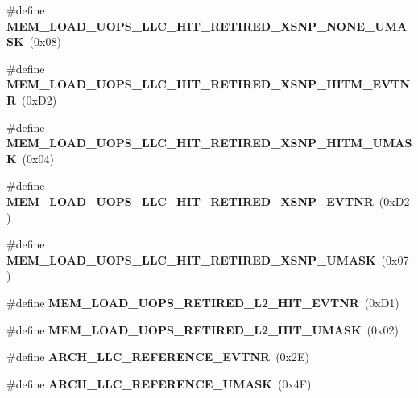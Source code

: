 \begin{DoxyCompactItemize}
\item 
\#define {\bfseries M\+E\+M\+\_\+\+L\+O\+A\+D\+\_\+\+U\+O\+P\+S\+\_\+\+L\+L\+C\+\_\+\+H\+I\+T\+\_\+\+R\+E\+T\+I\+R\+E\+D\+\_\+\+X\+S\+N\+P\+\_\+\+N\+O\+N\+E\+\_\+\+U\+M\+A\+S\+K}~(0x08)\label{types_8h_a88b8dc5c922214445a1261b75fdadece}

\item 
\#define {\bfseries M\+E\+M\+\_\+\+L\+O\+A\+D\+\_\+\+U\+O\+P\+S\+\_\+\+L\+L\+C\+\_\+\+H\+I\+T\+\_\+\+R\+E\+T\+I\+R\+E\+D\+\_\+\+X\+S\+N\+P\+\_\+\+H\+I\+T\+M\+\_\+\+E\+V\+T\+N\+R}~(0x\+D2)\label{types_8h_ae9f23b3173042a0c8efad2e54a38604e}

\item 
\#define {\bfseries M\+E\+M\+\_\+\+L\+O\+A\+D\+\_\+\+U\+O\+P\+S\+\_\+\+L\+L\+C\+\_\+\+H\+I\+T\+\_\+\+R\+E\+T\+I\+R\+E\+D\+\_\+\+X\+S\+N\+P\+\_\+\+H\+I\+T\+M\+\_\+\+U\+M\+A\+S\+K}~(0x04)\label{types_8h_aa57e7eeacd4455a45e3f3855d7dda1b7}

\item 
\#define {\bfseries M\+E\+M\+\_\+\+L\+O\+A\+D\+\_\+\+U\+O\+P\+S\+\_\+\+L\+L\+C\+\_\+\+H\+I\+T\+\_\+\+R\+E\+T\+I\+R\+E\+D\+\_\+\+X\+S\+N\+P\+\_\+\+E\+V\+T\+N\+R}~(0x\+D2)\label{types_8h_a9ab609523dfe9b17befadca150ac310f}

\item 
\#define {\bfseries M\+E\+M\+\_\+\+L\+O\+A\+D\+\_\+\+U\+O\+P\+S\+\_\+\+L\+L\+C\+\_\+\+H\+I\+T\+\_\+\+R\+E\+T\+I\+R\+E\+D\+\_\+\+X\+S\+N\+P\+\_\+\+U\+M\+A\+S\+K}~(0x07)\label{types_8h_aea0a7bb3fb1eea7c1a7d5f396c8a02d6}

\item 
\#define {\bfseries M\+E\+M\+\_\+\+L\+O\+A\+D\+\_\+\+U\+O\+P\+S\+\_\+\+R\+E\+T\+I\+R\+E\+D\+\_\+\+L2\+\_\+\+H\+I\+T\+\_\+\+E\+V\+T\+N\+R}~(0x\+D1)\label{types_8h_afae78f9334d9a6158f1523eabbb25d3a}

\item 
\#define {\bfseries M\+E\+M\+\_\+\+L\+O\+A\+D\+\_\+\+U\+O\+P\+S\+\_\+\+R\+E\+T\+I\+R\+E\+D\+\_\+\+L2\+\_\+\+H\+I\+T\+\_\+\+U\+M\+A\+S\+K}~(0x02)\label{types_8h_a4090d60fa90984dc2932583c2a7ca545}

\item 
\#define {\bfseries A\+R\+C\+H\+\_\+\+L\+L\+C\+\_\+\+R\+E\+F\+E\+R\+E\+N\+C\+E\+\_\+\+E\+V\+T\+N\+R}~(0x2\+E)\label{types_8h_a833581dd45657cb5f0a43d4a0bea3303}

\item 
\#define {\bfseries A\+R\+C\+H\+\_\+\+L\+L\+C\+\_\+\+R\+E\+F\+E\+R\+E\+N\+C\+E\+\_\+\+U\+M\+A\+S\+K}~(0x4\+F)\label{types_8h_a814bebc63a979bfe25932aec1e4f3e65}


\end{DoxyCompactItemize}
